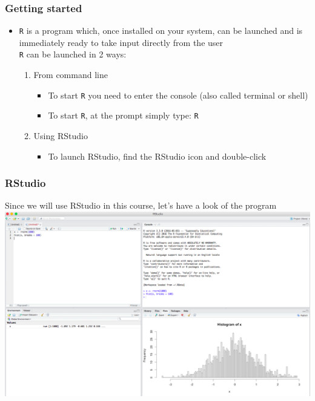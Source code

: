 \documentclass{beamer}
\begin{document}
\begin{frame}[fragile]
	\frametitle{Getting started}
        \begin{itemize}
          \item \texttt{R} is a program which, once installed on your system, can be launched and is immediately ready to take input directly from the user\\
         
  \texttt{R} can be launched in 2 ways:
	  \begin{enumerate}
	    \item From command line
	      \begin{itemize}
		\item To start \texttt{R} you need to enter the console (also called terminal or shell)
		\item To start \texttt{R}, at the prompt simply type: \Large \texttt{R}
	      \end{itemize}
	    \item Using RStudio
	      \begin{itemize}
		  \item To launch RStudio, find the RStudio icon and double-click
		\end{itemize}
	    \end{enumerate}
  \end{itemize}
\end{frame}

\begin{frame}
	\frametitle{RStudio}
	Since we will use RStudio in this course, let's have a look of the program\\
	\centering \includegraphics[scale=1.4]{figures/Rstudio_overview.png}
\end{frame}
\end{document}
